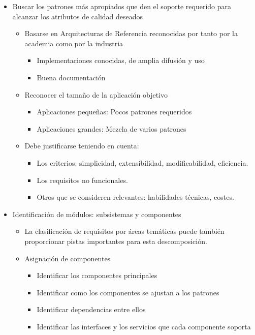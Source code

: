 \documentclass[12pt, twoside, openright]{report} %
\begin{document}
\begin{itemize}
	\item Buscar los patrones más apropiados que den el soporte requerido
		para alcanzar los atributos de calidad deseados
		\begin{itemize}
			\item Basarse en Arquitecturas de Referencia reconocidas por tanto por
			la academia como por la industria
 			\begin{itemize}
		
				\item
					Implementaciones conocidas, de amplia difusión y uso
				\item
					Buena documentación
			\end{itemize}
			\item Reconocer el tamaño de la aplicación objetivo
			\begin{itemize}
				\item
					Aplicaciones pequeñas: Pocos patrones requeridos
				\item
					Aplicaciones grandes: Mezcla de varios patrones
			\end{itemize}
			\item Debe justificarse teniendo en cuenta:
			\begin{itemize}
				\item
					Los criterios: simplicidad, extensibilidad, modificabilidad,
					eficiencia.
				\item
					Los requisitos no funcionales.
				\item
					Otros que se consideren relevantes: habilidades técnicas,
					costes.
			\end{itemize}
		\end{itemize}
	\item Identificación de módulos: subsistemas y componentes
		\begin{itemize}
			\item
			La clasificación de requisitos por áreas temáticas puede también
			proporcionar pistas importantes para esta descomposición.
			\item
			Asignación de componentes
			\begin{itemize}
				\item
					Identificar los componentes principales
				\item
					Identificar como los componentes se ajustan a los patrones
				\item
					Identificar dependencias entre ellos
				\item
					Identificar las interfaces y los servicios que cada componente
					soporta
			\end{itemize}
		\end{itemize}
\end{itemize}
\end{document}
